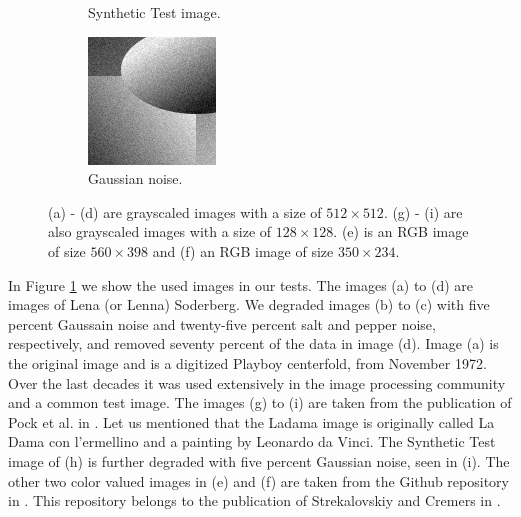 \documentclass[abstracton]{scrreprt}
\begin{document}
\begin{figure}[!ht]
\begin{subfigure}[b]{0.3\textwidth}
                    \caption{Synthetic Test image.}
                \end{subfigure}
                \begin{subfigure}[b]{0.3\textwidth}
                    \includegraphics[width=\textwidth]{img/images/synth_gauss_noise.png}
                    \caption{Gaussian noise.}
                \end{subfigure}
                \caption[Images used in Chapter 5]{(a) - (d) are grayscaled images with a size of $512 \times 512$. (g) - (i) are also grayscaled images with a size of $128 \times 128$. (e) is an RGB image of size $560 \times 398$ and (f) an RGB image of size $350 \times 234$.}
            \label{fig:images_used}
            \end{figure}
        In Figure \ref{fig:images_used} we show the used images in our tests. The images (a) to (d) are images of Lena (or Lenna) Soderberg. We degraded images (b) to (c) with five percent Gaussain noise and twenty-five percent salt and pepper noise, respectively, and removed seventy percent of the data in image (d). Image (a) is the original image and is a digitized Playboy centerfold, from November 1972. Over the last decades it was used extensively in the image processing community and a common test image. The images (g) to (i) are taken from the publication of Pock et al. in \cite{Pock-et-al-iccv09}. Let us mentioned that the Ladama image is originally called La Dama con l'ermellino and a painting by Leonardo da Vinci. The Synthetic Test image of (h) is further degraded with five percent Gaussian noise, seen in (i). The other two color valued images in (e) and (f) are taken from the Github repository in \cite{FastMS}. This repository belongs to the publication of Strekalovskiy and Cremers in \cite{Strekalovskiy-Cremers-eccv14}.\\
\end{document}
